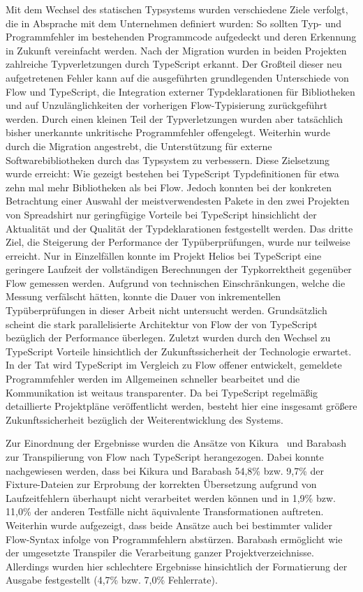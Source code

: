 Mit dem Wechsel des statischen Typsystems wurden verschiedene Ziele verfolgt, die in Absprache mit dem Unternehmen definiert wurden:
So sollten Typ- und Programmfehler im bestehenden Programmcode aufgedeckt und deren Erkennung in Zukunft vereinfacht werden. Nach der Migration wurden in beiden Projekten zahlreiche Typverletzungen durch TypeScript erkannt. Der Großteil dieser neu aufgetretenen Fehler kann auf die ausgeführten grundlegenden Unterschiede von Flow und TypeScript, die Integration externer Typdeklarationen für Bibliotheken und auf Unzulänglichkeiten der vorherigen Flow-Typisierung zurückgeführt werden. Durch einen kleinen Teil der Typverletzungen wurden aber tatsächlich bisher unerkannte unkritische Programmfehler offengelegt.
Weiterhin wurde durch die Migration angestrebt, die Unterstützung für externe Softwarebibliotheken durch das Typsystem zu verbessern. Diese Zielsetzung wurde erreicht: Wie gezeigt bestehen bei TypeScript Typdefinitionen für etwa zehn mal mehr Bibliotheken als bei Flow. Jedoch konnten bei der konkreten Betrachtung einer Auswahl der meistverwendesten Pakete in den zwei Projekten von Spreadshirt nur geringfügige Vorteile bei TypeScript hinsichlicht der Aktualität und der Qualität der Typdeklarationen festgestellt werden.
Das dritte Ziel, die Steigerung der Performance der Typüberprüfungen, wurde nur teilweise erreicht. Nur in Einzelfällen konnte im Projekt Helios bei TypeScript eine geringere Laufzeit der vollständigen Berechnungen der Typkorrektheit gegenüber Flow gemessen werden. Aufgrund von technischen Einschränkungen, welche die Messung verfälscht hätten, konnte die Dauer von inkrementellen Typüberprüfungen in dieser Arbeit nicht untersucht werden. Grundsätzlich scheint die stark parallelisierte Architektur von Flow der von TypeScript bezüglich der Performance überlegen.
Zuletzt wurden durch den Wechsel zu TypeScript Vorteile hinsichtlich der Zukunftssicherheit der Technologie erwartet. In der Tat wird TypeScript im Vergleich zu Flow offener entwickelt, gemeldete Programmfehler werden im Allgemeinen schneller bearbeitet und die Kommunikation ist weitaus transparenter. Da bei TypeScript regelmäßig detaillierte Projektpläne veröffentlicht werden, besteht hier eine insgesamt größere Zukunftssicherheit bezüglich der Weiterentwicklung des Systems.

\enlargethispage{2\baselineskip}
Zur Einordnung der Ergebnisse wurden die Ansätze von Kikura~\autocite{KIKURA:FLOW_TO_TS} und Barabash~\autocite{BARABASH:FLOW_TO_TS} zur Transpilierung von Flow nach TypeScript herangezogen. Dabei konnte nachgewiesen werden, dass bei Kikura und Barabash 54,8\% bzw. 9,7\% der Fixture-Dateien zur Erprobung der korrekten Übersetzung aufgrund von Laufzeitfehlern überhaupt nicht verarbeitet werden können und in 1,9\% bzw. 11,0\% der anderen Testfälle nicht äquivalente Transformationen auftreten. Weiterhin wurde aufgezeigt, dass beide Ansätze auch bei bestimmter valider Flow-Syntax infolge von Programmfehlern abstürzen. Barabash ermöglicht wie der umgesetzte Transpiler die Verarbeitung ganzer Projektverzeichnisse. Allerdings wurden hier schlechtere Ergebnisse hinsichtlich der Formatierung der Ausgabe festgestellt (4,7\% bzw. 7,0\% Fehlerrate).

